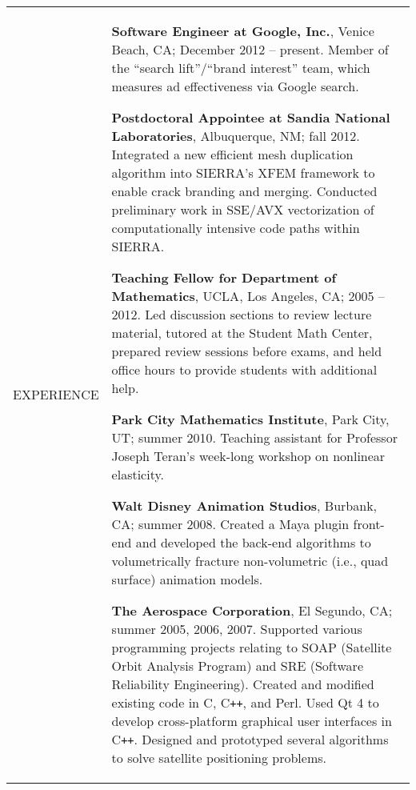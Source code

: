 \documentclass{article}
\begin{document}
\begin{center}
\vspace{\VS}

\begin{tabular}{@{}p{\CWa\columnwidth}@{}p{\CWb\columnwidth}@{}}
{\small EXPERIENCE} &
\begin{minipage}[t]{\CWb\columnwidth}
\par \textbf{Software Engineer at Google, Inc.}, Venice Beach, CA; December 2012 -- present. Member of the ``search lift''/``brand interest'' team, which measures ad effectiveness via Google search.
\vspace{\VSEX}
\par \textbf{Postdoctoral Appointee at Sandia National Laboratories}, Albuquerque, NM; fall 2012. Integrated a new efficient mesh duplication algorithm into SIERRA's XFEM framework to enable crack branding and merging. Conducted preliminary work in SSE/AVX vectorization of computationally intensive code paths within SIERRA.
\vspace{\VSEX}
\par \textbf{Teaching Fellow for Department of Mathematics}, UCLA, Los Angeles, CA; 2005 -- 2012. Led discussion sections to review lecture material, tutored at the Student Math Center, prepared review sessions before exams, and held office hours to provide students with additional help. %
\vspace{\VSEX}
\par \textbf{Park City Mathematics Institute}, Park City, UT; summer 2010. Teaching assistant for Professor Joseph Teran's week-long workshop on nonlinear elasticity.
\vspace{\VSEX}
\par \textbf{Walt Disney Animation Studios}, Burbank, CA; summer 2008. Created a Maya plugin front-end and developed the back-end algorithms to volumetrically fracture non-volumetric (i.e., quad surface) animation models.
\vspace{\VSEX}
\par \textbf{The Aerospace Corporation}, El Segundo, CA; summer 2005, 2006, 2007. Supported various programming projects relating to SOAP (Satellite Orbit Analysis Program) and SRE (Software Reliability Engineering). Created and modified existing code in C, C\texttt{++}, and Perl. Used Qt 4 to develop cross-platform graphical user interfaces in C\texttt{++}. Designed and prototyped several algorithms to solve satellite positioning problems.

\end{minipage}
\end{tabular}
\end{center}
\end{document}
